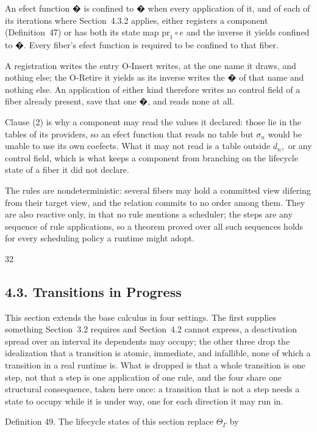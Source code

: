 \documentclass[
  10
]{article}
\newcounter{none} %
\begin{document}
An efect function � is confined to � when every application of it, and
of each of its iterations where Section~4.3.2 applies, either registers
a component (Definition~47) or has both its state map
\(\mathrm { p r } _ { 1 } \circ e\) and the inverse it yields confined
to �. Every fiber's efect function is required to be confined to that
fiber.

A registration writes the entry O-Insert writes, at the one name it
draws, and nothing else; the O-Retire it yields as its inverse writes
the � of that name and nothing else. An application of either kind
therefore writes no control field of a fiber already present, save that
one �, and reads none at all.

Clause (2) is why a component may read the values it declared: those lie
in the tables of its providers, so an efect function that reads no table
but \(\sigma _ { n }\) would be unable to use its own coefects. What it
may not read is a table outside \(d _ { n } ,\) or any control field,
which is what keeps a component from branching on the lifecycle state of
a fiber it did not declare.

The rules are nondeterministic: several fibers may hold a committed view
difering from their target view, and the relation commits to no order
among them. They are also reactive only, in that no rule mentions a
scheduler; the steps are any sequence of rule applications, so a theorem
proved over all such sequences holds for every scheduling policy a
runtime might adopt.

32

\subsection{4.3. Transitions in Progress}\label{transitions-in-progress}

This section extends the base calculus in four settings. The first
supplies something Section~3.2 requires and Section~4.2 cannot express,
a deactivation spread over an interval its dependents may occupy; the
other three drop the idealization that a transition is atomic,
immediate, and infallible, none of which a transition in a real runtime
is. What is dropped is that a whole transition is one step, not that a
step is one application of one rule, and the four share one structural
consequence, taken here once: a transition that is not a step needs a
state to occupy while it is under way, one for each direction it may run
in.

Definition 49. The lifecycle states of this section replace
\(\Theta _ { \Gamma }\) by
\end{document}
